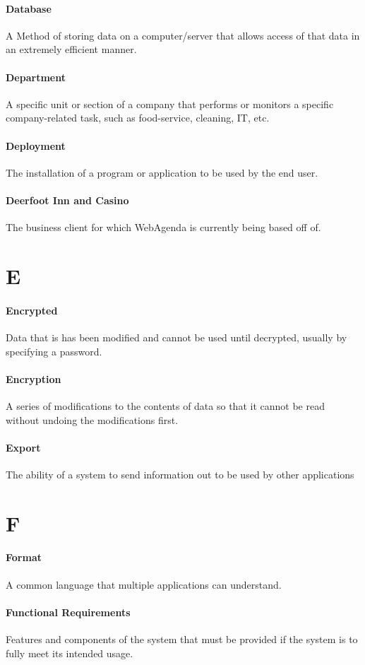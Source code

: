 \documentclass[letterpaper,12pt]{report}
\begin{document}
\paragraph{Database} A Method of storing data on a computer/server that allows access of that data in an extremely efficient manner.
\paragraph{Department} A specific unit or section of a company that performs or monitors a specific company-related task, such as food-service, cleaning, IT, etc.
\paragraph{Deployment} The installation of a program or application to be used by the end user.
\paragraph{Deerfoot Inn and Casino} The business client for which WebAgenda is currently being based off of.
\section*{E}
\paragraph{Encrypted} Data that is has been modified and cannot be used until decrypted, usually by specifying a password.
\paragraph{Encryption} A series of modifications to the contents of data so that it cannot be read without undoing the modifications first.
\paragraph{Export} The ability of a system to send information out to be used by other applications 
\section*{F}
\paragraph{Format} A common language that multiple applications can understand. 
\paragraph{Functional Requirements} Features and components of the system that must be provided if the system is to fully meet its intended usage.
\end{document}
